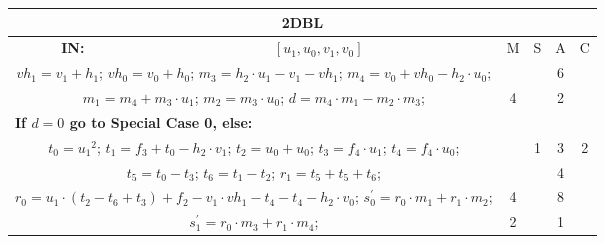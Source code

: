 \begin{tabular}{|c|cr|c|c|c|c|}
\hline
\multicolumn{7}{|c|}{\bf{2DBL}} \TS \\
\hline
\bf{IN:} &\multicolumn{2}{|c|}{$[u_1,u_0,v_1,v_0]$}
\TS & M & \hspace{1pt}S\hspace{1pt} & A & \hspace{1pt}C\hspace{1pt} \\
\hline
\multicolumn{3}{|R{340pt}|}{ 
$vh_1=v_1+h_1$; \hspace{4pt} 
$vh_0=v_0+h_0$; \hspace{4pt} 
$m_3=h_2 \cdot u_1-v_1-vh_1$; \hspace{4pt} 
$m_4=v_0+vh_0-h_2 \cdot u_0$; \hspace{4pt} 
} &  &  & 6 & \\
\multicolumn{3}{|R{340pt}|}{ 
$m_1=m_4+m_3 \cdot u_1$; \hspace{4pt} 
$m_2=m_3 \cdot u_0$; \hspace{4pt} 
$d=m_4 \cdot m_1-m_2 \cdot m_3$; \hspace{4pt} 
} & 4 &  & 2 & \\
\multicolumn{3}{|l|}{ 
 \bf{If $d = 0$ go to Special Case 0, else:} } &  &  &  & \\
\multicolumn{3}{|R{340pt}|}{ 
$t_0=u_1{}^{2}$; \hspace{4pt} 
$t_1=f_3+t_0-h_2 \cdot v_1$; \hspace{4pt} 
$t_2=u_0+u_0$; \hspace{4pt} 
$t_3=f_4 \cdot u_1$; \hspace{4pt} 
$t_4=f_4 \cdot u_0$; \hspace{4pt} 
} &  & 1 & 3 & 2\\
\multicolumn{3}{|R{340pt}|}{ 
$t_5=t_0-t_3$; \hspace{4pt} 
$t_6=t_1-t_2$; \hspace{4pt} 
$r_1=t_5+t_5+t_6$; \hspace{4pt} 
} &  &  & 4 & \\
\multicolumn{3}{|R{340pt}|}{ 
$r_0=u_1 \cdot (t_2-t_6+t_3)+f_2-v_1 \cdot vh_1-t_4-t_4-h_2 \cdot v_0$; \hspace{4pt} 
$s^{\prime}_0=r_0 \cdot m_1+r_1 \cdot m_2$; \hspace{4pt} 
} & 4 &  & 8 & \\
\multicolumn{3}{|R{340pt}|}{ 
$s^{\prime}_1=r_0 \cdot m_3+r_1 \cdot m_4$; \hspace{4pt} 
} & 2 &  & 1 & \\

\end{tabular}
